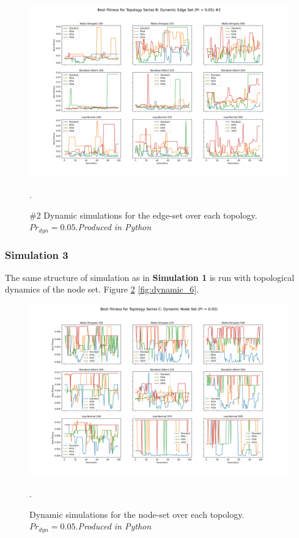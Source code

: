 \documentclass[
	a4paper, %
	10pt, %
	unnumberedsections, %
	twoside, %
]{LTJournalArticle}
\begin{document}
\begin{figure}
	\includegraphics[width=\linewidth]{Figures/sims/dynamic/series_b_edge_2.jpg}
	\caption{\#2 Dynamic simulations for the edge-set over each topology. \(Pr_{dyn} = 0.05\).\emph{Produced in Python}}. 
	\label{fig:dynamic_4}
\end{figure}

\subsubsection{Simulation 3} The same structure of simulation as in \textbf{Simulation 1} is run with topological dynamics of the node set. Figure \ref{fig:dynamic_5} \ref{fig:dynamic_6}.

 \begin{figure}
	\includegraphics[width=\linewidth]{Figures/sims/dynamic/series_c_node.jpg}
	\caption{Dynamic simulations for the node-set over each topology. \(Pr_{dyn} = 0.05\).\emph{Produced in Python}}. 
	\label{fig:dynamic_5}
\end{figure}
\end{document}
